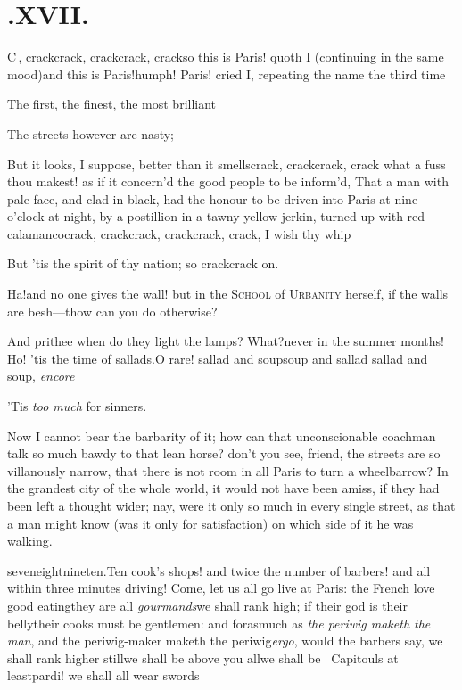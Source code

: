 \documentclass{article}
\begin{document}
\vfill{}\eject
\section{.\enspace XVII.}

\lettrine{C}{\,}, crack\tsh crack, crack\break\tsh crack, crack\tsk so this is Paris!  quoth I
(continuing in the same mood)\tsk and this is Paris!\tsh humph!\break
\tsh Paris! cried I, repeating the name the third time\tsh

The first, the finest, the most brilliant\tsh

\tsk The streets however are nasty;

But it looks, I suppose, better than it smells\tsh crack, crack\tsh crack, crack\tsh
what a fuss thou makest!\tsk\break
as if it concern’d the good people to be inform’d, That a
man with pale face, and clad in black, had the honour to be driven into Paris at nine
o’clock at night, by a postillion in a tawny yellow jerkin, turned up with red
calamanco\tsk crack, crack\tsh crack, crack\tsh crack, crack,\break
\tsh I wish thy whip\tsh

\tsh But ’tis the spirit of thy nation; so crack\tsk crack on.

Ha!\tsh and no one gives the wall!\break
\tsh but in the \textsc{School} of \textsc{Urbanity}\break
herself, if the walls are besh—t\tsk how can you do otherwise?

And prithee when do they light the lamps? What?\tsk never in the summer months!\tsh
Ho!  ’tis the time of sallads.\break\tsh O rare! sallad and soup\tsk soup and sallad\tsk
sallad and soup, \textit{encore}\tsh{}

\tsh ’Tis \textit{too much} for sinners.

Now I cannot bear the barbarity of it;\break
how can that unconscionable coachman talk so much bawdy to that lean horse?\break
don’t you see, friend, the streets are so villanously narrow, that there is not room in
all Paris to turn a wheelbarrow?\break
In the grandest city of the whole world, it would
not have been amiss, if they had been left a thought wider; nay, were it only so
much in every single street, as that a man might know (was it only for satisfaction)
on which side of it he was walking.

\noindent
{}\break
seven\tsk eight\tsk nine\tsk ten.\tsk Ten cook’s
shops! and twice the number of barbers! and all within three minutes driving!
Come, let us all go live at Paris: the French
love good eating\tsh they are all \textit{gourmands}\tsh we shall rank high; if their
god is their belly\tsh their cooks must be gentlemen: and forasmuch as \textit{the
periwig maketh the man}, and the periwig-maker maketh the periwig\tsk \textit{ergo},
would the barbers say, we shall rank higher still\tsk we shall be above you all\tsk we
shall be \fnast\  Capitouls at
least\tsk pardi! we shall all wear swords\tsh
\end{document}

